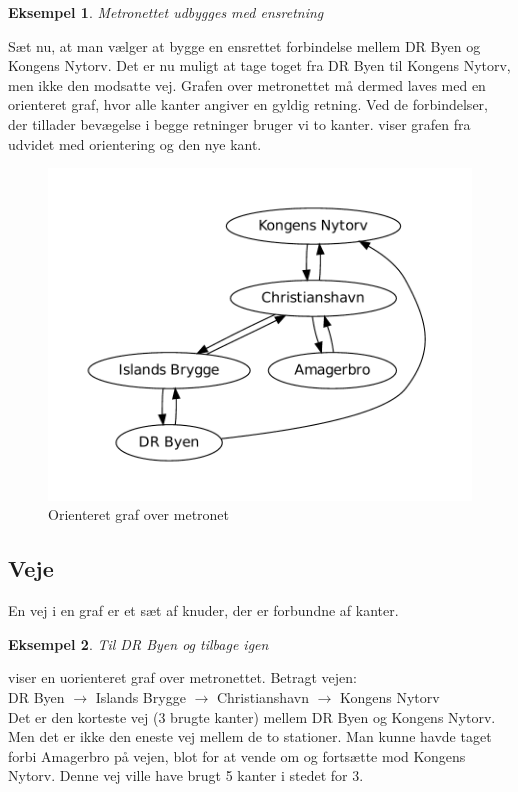 \documentclass[10pt,a4paper,danish]{article}
\newtheorem{example}{Eksempel}[subsection]
\begin{document}
\begin{example}Metronettet udbygges med ensretning\end{example} Sæt
nu, at man vælger at bygge en ensrettet forbindelse mellem DR Byen og
Kongens Nytorv. Det er nu muligt at tage toget fra DR Byen til Kongens
Nytorv, men ikke den modsatte vej. Grafen over metronettet må dermed
laves med en orienteret graf, hvor alle kanter angiver en gyldig
retning. Ved de forbindelser, der tillader bevægelse i begge retninger
bruger vi to kanter.  viser grafen fra
 udvidet med orientering og den nye kant.
\begin{figure}[h]
\centering
\includegraphics[width=.75\textwidth]{graphs/metro1.pdf}
\caption{Orienteret graf over metronet}
\label{fig:metro1}
\end{figure}

\subsection{Veje}
En vej i en graf er et sæt af knuder, der er forbundne af kanter.

\begin{example}
\label{exm:path}
Til DR Byen og tilbage igen\end{example}

 viser en uorienteret graf over metronettet.
Betragt vejen:\\\indent
DR Byen $\to$ Islands Brygge $\to$ Christianshavn $\to$ Kongens Nytorv
\\

Det er den korteste vej (3 brugte kanter) mellem DR Byen og Kongens
Nytorv. Men det er ikke den eneste vej mellem de to stationer. Man
kunne havde taget forbi Amagerbro på vejen, blot for at vende om og
fortsætte mod Kongens Nytorv. Denne vej ville have brugt 5 kanter i
stedet for 3.
\end{document}
